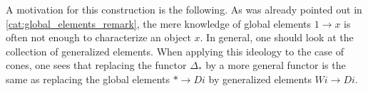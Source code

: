 

    \begin{remark}
        A motivation for this construction is the following. As was already pointed out in \cref{cat:global_elements_remark}, the mere knowledge of global elements $1\rightarrow x$ is often not enough to characterize an object $x$. In general, one should look at the collection of generalized elements. When applying this ideology to the case of cones, one sees that replacing the functor $\Delta_\ast$ by a more general functor is the same as replacing the global elements $\ast\rightarrow Di$ by generalized elements $Wi\rightarrow Di$.
    \end{remark}

